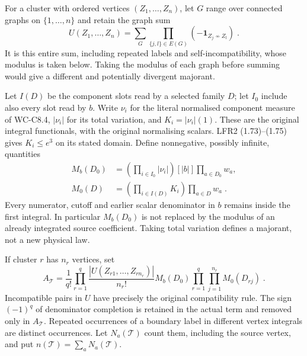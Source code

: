 \documentclass[11pt]{article}
\begin{document}
For a cluster with ordered vertices $(Z_1,\ldots,Z_n)$, let $G$
range over connected graphs on $\{1,\ldots,n\}$ and retain
the graph sum
\begin{equation}\label{eq:c8-fourth-ursell}
    U(Z_1,\ldots,Z_n)=
        \sum_G\prod_{\{j,l\}\in E(G)}
            \left(-\mathbf 1_{Z_j\not\sim Z_l}\right)\;.
\end{equation}
It is this entire sum, including repeated labels and
self-incompatibility, whose modulus is taken below. Taking the
modulus of each graph before summing would give a different and
potentially divergent majorant.

Let $I(D)$ be the component slots read by a selected family $D$;
let $I_0$ include also every slot read by $b$. Write $\nu_i$ for the
literal normalised component measure of WC-C8.4, $|\nu_i|$ for its
total variation, and $K_i=|\nu_i|(1)$. These are the original
integral functionals, with the original normalising scalars.
LFR2 (1.73)--(1.75) gives $K_i\leq e^3$ on its stated domain.
Define nonnegative, possibly infinite, quantities
\begin{equation}\label{eq:c8-fourth-selected-majorants}
    \begin{aligned}
        M_b(D_0)&=
            \left(\prod_{i\in I_0}|\nu_i|\right)[|b|]
                \prod_{a\in D_0}w_a,\\
        M_0(D)&=\left(\prod_{i\in I(D)}K_i\right)
                \prod_{a\in D}w_a\;.
    \end{aligned}
\end{equation}
Every numerator, cutoff and earlier scalar denominator in $b$
remains inside the first integral. In particular $M_b(D_0)$ is not
replaced by the modulus of an already integrated source coefficient.
Taking total variation defines a majorant, not a new physical law.

If cluster $r$ has $n_r$ vertices, set
\begin{equation}\label{eq:c8-fourth-term-majorant}
    A_{\mathcal T}=
        \frac{1}{q!}\prod_{r=1}^{q}
            \frac{|U(Z_{r1},\ldots,Z_{rn_r})|}{n_r!}
        M_b(D_0)\prod_{r=1}^{q}\prod_{j=1}^{n_r}M_0(D_{rj})\;.
\end{equation}
Incompatible pairs in $U$ have precisely the original compatibility
rule. The sign $(-1)^q$ of denominator completion is retained in
the actual term and removed only in $A_{\mathcal T}$.
Repeated occurrences of a boundary label in different vertex
integrals are distinct occurrences. Let $N_a(\mathcal T)$ count
them, including the source vertex, and put
$n(\mathcal T)=\sum_aN_a(\mathcal T)$.
\end{document}
